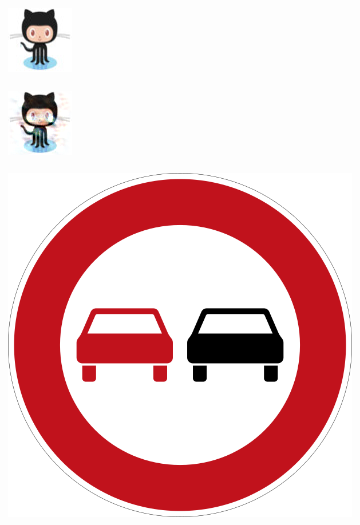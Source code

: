 \begin{figure}
\vspace{4ex}
\centering
\begin{subfigure}{.19\linewidth}
  \centering
  \includegraphics[width=0.7\linewidth]{imgs/octocat}
\end{subfigure}
\begin{subfigure}{.19\linewidth}
  \centering
  \includegraphics[width=0.7\linewidth]{imgs/4}
\end{subfigure}
\begin{subfigure}{.19\linewidth}
  \centering
  \includegraphics[width=0.7\linewidth]{imgs/4_real}
\end{subfigure}


\end{figure}
